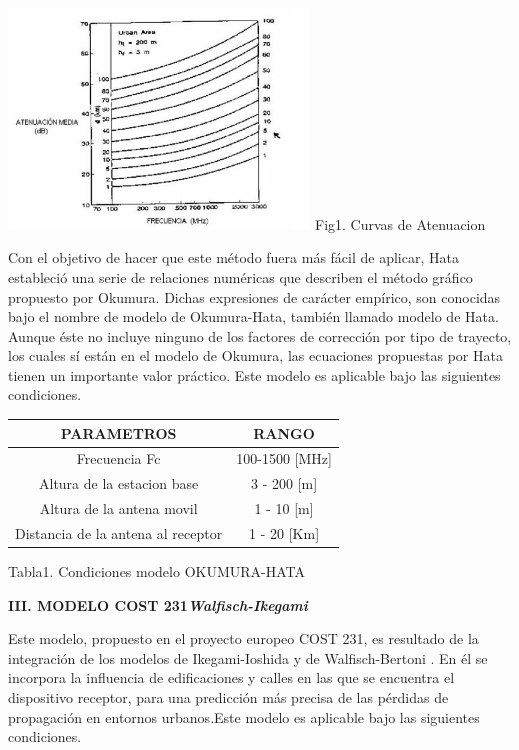 \documentclass[10pt,a4paper]{article}
\begin{document}
\begin{multicols}{2}
\begin{center}
\includegraphics[width=8cm]{image/okumura.JPG}
Fig1. Curvas de Atenuacion 
\end{center}

Con el objetivo de hacer que este método fuera más fácil
de aplicar, Hata estableció una serie de relaciones numéricas
que describen el método gráfico propuesto por Okumura.
Dichas expresiones de carácter empírico, son conocidas bajo
el nombre de modelo de Okumura-Hata, también llamado
modelo de Hata. Aunque éste no incluye ninguno
de los factores de corrección por tipo de trayecto, los cuales
sí están en el modelo de Okumura, las ecuaciones propuestas
por Hata tienen un importante valor práctico. Este modelo es
aplicable bajo las siguientes condiciones.\
\begin{center}
\begin{tabular}{|c|c|}\hline  %
PARAMETROS & RANGO \\ \hline   %
Frecuencia Fc & 100-1500 [MHz] \\ \hline 
Altura de la estacion base & 3 - 200 [m] \\ \hline 
Altura de la antena movil   &  1 - 10 [m] \\ \hline
Distancia de la antena al receptor & 1 - 20 [Km] \\ \hline
\end{tabular}
\end{center}
\begin{center}
Tabla1. Condiciones modelo OKUMURA-HATA
\end{center}


\begin{center}
\textbf{III. MODELO COST 231\textit{Walfisch-Ikegami}}
\end{center}

Este modelo, propuesto en el proyecto europeo COST 231, es resultado de la integración de los modelos de Ikegami-Ioshida y de Walfisch-Bertoni . En él se incorpora la influencia de edificaciones y calles en las que se encuentra el dispositivo receptor, para una predicción más precisa de las pérdidas de propagación en entornos urbanos.Este modelo es aplicable bajo las siguientes condiciones.


\end{multicols}
\end{document}
